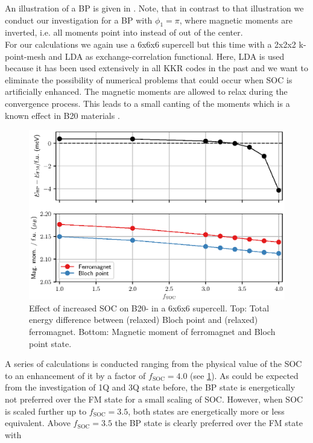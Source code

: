 \documentclass[graybox]{svmult}
\begin{document}
An illustration of a BP is given in . Note, that in contrast to
that illustration we conduct our investigation for a BP with $\phi_{1}=\pi$, where magnetic moments
are inverted, i.e. all moments point into instead of out of the center.
\\
For our calculations we
again use a 6x6x6 supercell but this time with a 2x2x2 k-point-mesh and LDA as
exchange-correlation functional. Here, LDA is used because it has been used extensively in all KKR codes
in the past and 
we want to eliminate the possibility of numerical problems that could occur when SOC is artificially enhanced.
The magnetic moments are allowed to relax during the convergence process.
This leads to a small canting of the moments which is a known effect in
B20 materials \cite{chizhikov_multishell_2013}.
\begin{figure}[!htb]
  \centering
   \includegraphics[width=1.00\textwidth]{Figures/MnGe_ferro_bp.eps}
	\caption{Effect of increased SOC on B20- in a 6x6x6 supercell.
	Top: Total energy difference between (relaxed) Bloch point and (relaxed) ferromagnet.
	Bottom: Magnetic moment of ferromagnet and Bloch point state.}
\label{fig:MnGe_kkrnano_comparison_bp}
\end{figure}
A series of calculations is conducted ranging from the physical value of the SOC 
to
an enhancement of it by a
factor of $f_{\text{SOC}}=4.0$ (see \cref{fig:MnGe_kkrnano_comparison_bp}).
As could be expected from the investigation of 1Q and 3Q state before,
the BP state is energetically not preferred over the FM state for a small
scaling of SOC.
However, when SOC is scaled further up to $f_{\text{SOC}}=3.5$,
both states are energetically more or less equivalent.
Above $f_{\text{SOC}}=3.5$ the BP state is clearly preferred over the FM state with
\end{document}
